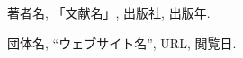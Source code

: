 \documentclass[a4j, 11pt, report]{jsarticle}
\begin{document}
\begin{thebibliography}{99}
    著者名, 「文献名」, 出版社, 出版年.

    団体名, “ウェブサイト名”, URL, 閲覧日.
\end{thebibliography}
\end{document}
